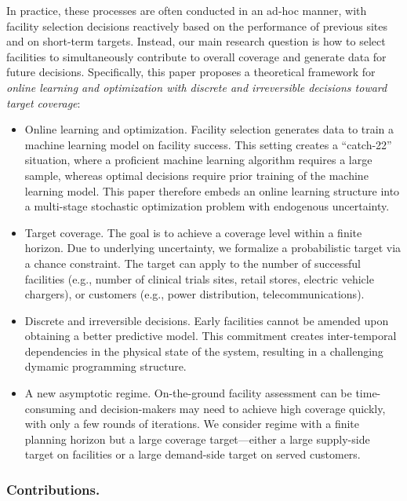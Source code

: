 \documentclass[nonblindrev]{informs3noheader}
\begin{document}
In practice, these processes are often conducted in an ad-hoc manner, with facility selection decisions reactively based on the performance of previous sites and on short-term targets. Instead, our main research question is how to select facilities to simultaneously contribute to overall coverage and generate data for future decisions. Specifically, this paper proposes a theoretical framework for \textit{online learning and optimization with discrete and irreversible decisions toward target coverage}:
\begin{itemize}
    \item[--] Online learning and optimization. Facility selection generates data to train a machine learning model on facility success. This setting creates a ``catch-22'' situation, where a proficient machine learning algorithm requires a large sample, whereas optimal decisions require prior training of the machine learning model. This paper therefore embeds an online learning structure into a multi-stage stochastic optimization problem with endogenous uncertainty.
    \item[--] Target coverage. The goal is to achieve a coverage level within a finite horizon. Due to underlying uncertainty, we formalize a probabilistic target via a chance constraint. The target can apply to the number of successful facilities (e.g., number of clinical trials sites, retail stores, electric vehicle chargers), or customers (e.g., power distribution, telecommunications).
    \item[--] Discrete and irreversible decisions. Early facilities cannot be amended upon obtaining a better predictive model. This commitment creates inter-temporal dependencies in the physical state of the system, resulting in a challenging dymamic programming structure.
    \item[--] A new asymptotic regime. On-the-ground facility assessment can be time-consuming and decision-makers may need to achieve high coverage quickly, with only a few rounds of iterations. We consider regime with a finite planning horizon but a large coverage target---either a large supply-side target on facilities or a large demand-side target on served customers.
\end{itemize}

\subsubsection*{Contributions.}
\end{document}
